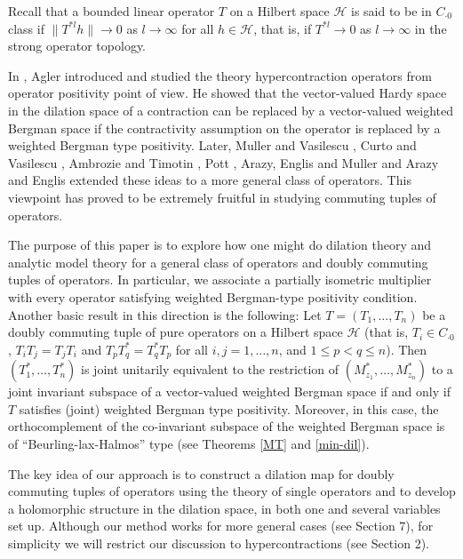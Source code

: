 \documentclass[12pt]{amsart}
\begin{document}
Recall that a bounded linear operator $T$ on a Hilbert space ${\mathcal{H}}$
is said to be in $C_{\cdot 0}$ class if $\|T^{*l}h\| {\rightarrow} 0$ as $l
{\rightarrow} \infty$ for all $h \in {\mathcal{H}}$, that is, if $T^{*l} {\rightarrow} 0$ as
$l {\rightarrow} \infty$ in the strong operator topology.

In \cite{Ag}, Agler introduced and studied the theory
hypercontraction operators from operator positivity point of view.
He showed that the vector-valued Hardy space in the dilation space
of a contraction can be replaced by a vector-valued weighted Bergman
space if the contractivity assumption on the operator is replaced by
a weighted Bergman type positivity. Later, Muller and Vasilescu
\cite{MV}, Curto and Vasilescu \cite{CV}, Ambrozie and Timotin
\cite{AT1, AT2}, Pott \cite{Pott}, Arazy, Englis and Muller
\cite{AEM} and Arazy and Englis \cite{AE} extended these ideas to a
more general class of operators. This viewpoint has proved to be
extremely fruitful in studying commuting tuples of operators.

The purpose of this paper is to explore how one might do dilation
theory and analytic model theory for a general class of operators
and doubly commuting tuples of operators. In particular, we
associate a partially isometric multiplier with every operator
satisfying weighted Bergman-type positivity condition. Another basic
result in this direction is the following: Let $T = (T_1, \ldots,
T_n)$ be a doubly commuting tuple of pure operators on a Hilbert
space ${\mathcal{H}}$ (that is, $T_i \in C_{\cdot 0}$, $T_i T_j = T_j T_i$
and $T_p T_q^* = T_q^* T_p$ for all $i, j = 1, \ldots, n$, and $1
\leq p < q \leq n$). Then $(T_1^*, \ldots, T_n^*)$ is joint
unitarily equivalent to the restriction of $(M_{z_1}^*, \ldots,
M_{z_n}^*)$ to a joint invariant subspace of a vector-valued
weighted Bergman space if and only if $T$ satisfies (joint) weighted
Bergman type positivity. Moreover, in this case, the orthocomplement
of the co-invariant subspace of the weighted Bergman space is of
``Beurling-lax-Halmos'' type (see Theorems \ref{MT} and
\ref{min-dil}).

The key idea of our approach is to construct a dilation map for
doubly commuting tuples of operators using the theory of single
operators and to develop a holomorphic structure in the dilation
space, in both one and several variables set up. Although our method
works for more general cases (see Section 7), for simplicity we will
restrict our discussion to hypercontractions (see Section 2).
\end{document}
